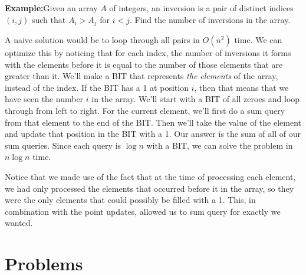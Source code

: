 \documentclass{article}
\begin{document}
    \vspace{5pt}\noindent\textbf{Example:}\newline\noindent Given an array $A$ of integers, an inversion is a pair of distinct indices $(i,j)$ such that $A_i > A_j$ for $i < j$. Find the number of inversions in the array.
    
    \vspace{5pt}\noindent A naive solution would be to loop through all pairs in $O(n^2)$ time. We can optimize this by noticing that for each index, the number of inversions it forms with the elements before it is equal to the number of those elements that are greater than it. We'll make a BIT that represents \textit{the elements} of the array, instead of the index. If the BIT has a 1 at position $i$, then that means that we have seen the number $i$ in the array. We'll start with a BIT of all zeroes and loop through from left to right. For the current element, we'll first do a sum query from that element to the end of the BIT. Then we'll take the value of the element and update that position in the BIT with a 1. Our answer is the sum of all of our sum queries. Since each query is $\log n$ with a BIT, we can solve the problem in $n \log n$ time.
    
    \vspace{5pt}\noindent Notice that we made use of the fact that at the time of processing each element, we had only processed the elements that occurred before it in the array, so they were the only elements that could possibly be filled with a 1. This, in combination with the point updates, allowed us to sum query for exactly we wanted.
    
    
\section{Problems}
\end{document}
